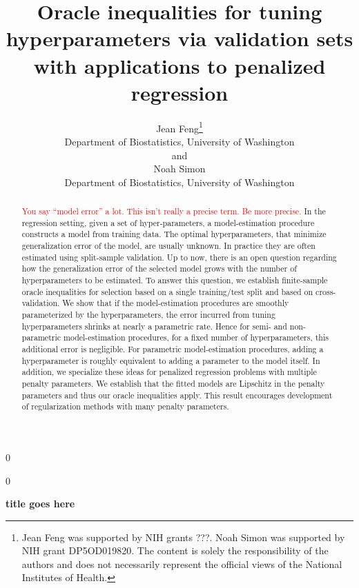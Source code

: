 \documentclass[12pt]{article}
\newcommand{\blind}{0}
\begin{document}
\def\spacingset#1{\renewcommand{\baselinestretch}%
{#1}\small\normalsize} \spacingset{1}



\blind
{
  \title{\bf Oracle inequalities for tuning hyperparameters via validation sets with applications to penalized regression}
  \author{Jean Feng\thanks{
    Jean Feng was supported by NIH grants ???. %
    Noah Simon was supported by NIH grant DP5OD019820.
    The content is solely the responsibility of the authors and does not necessarily represent the official views of the National Institutes of Health.}\\
    Department of Biostatistics, University of Washington\\
    and \\
    Noah Simon \\
    Department of Biostatistics, University of Washington}
  \maketitle
} \fi

\blind
{
  \bigskip
  \bigskip
  \bigskip
  \begin{center}
    {\LARGE\bf title goes here}
\end{center}
  \medskip
} \fi

\bigskip
\begin{abstract}

\textcolor{red}{You say ``model error'' a lot. This isn't really a precise term. Be more precise.} In the regression setting, given a set of hyper-parameters, a model-estimation procedure constructs a model from training data. The optimal hyperparameters, that minimize generalization error of the model, are usually unknown. In practice they are often estimated using split-sample validation. Up to now, there is an open question regarding how the generalization error of the selected model grows with the number of hyperparameters to be estimated. To answer this question, we establish finite-sample oracle inequalities for selection based on a single training/test split and based on cross-validation. We show that if the model-estimation procedures are smoothly parameterized by the hyperparameters, the error incurred from tuning hyperparameters shrinks at nearly a parametric rate. Hence for semi- and non-parametric model-estimation procedures, for a fixed number of hyperparameters, this additional error is negligible. For parametric model-estimation procedures, adding a hyperparameter is roughly equivalent to adding a parameter to the model itself. In addition, we specialize these ideas for penalized regression problems with multiple penalty parameters. We establish that the fitted models are Lipschitz in the penalty parameters and thus our oracle inequalities apply. This result encourages development of regularization methods with many penalty parameters.
\end{abstract}
\end{document}
